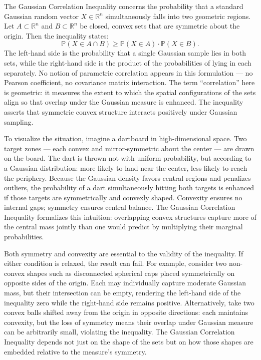 The Gaussian Correlation Inequality concerns the probability that a standard Gaussian random vector \( X \in \mathbb{R}^n \) simultaneously falls into two geometric regions. Let \( A \subset \mathbb{R}^n \) and \( B \subset \mathbb{R}^n \) be closed, convex sets that are symmetric about the origin. Then the inequality states:
\[
\mathbb{P}(X \in A \cap B) \geq \mathbb{P}(X \in A) \cdot \mathbb{P}(X \in B).
\]
The left-hand side is the probability that a single Gaussian sample lies in both sets, while the right-hand side is the product of the probabilities of lying in each separately. No notion of parametric correlation appears in this formulation — no Pearson coefficient, no covariance matrix interaction. The term “correlation” here is geometric: it measures the extent to which the spatial configurations of the sets align so that overlap under the Gaussian measure is enhanced. The inequality asserts that symmetric convex structure interacts positively under Gaussian sampling.

To visualize the situation, imagine a dartboard in high-dimensional space. Two target zones — each convex and mirror-symmetric about the center — are drawn on the board. The dart is thrown not with uniform probability, but according to a Gaussian distribution: more likely to land near the center, less likely to reach the periphery. Because the Gaussian density favors central regions and penalizes outliers, the probability of a dart simultaneously hitting both targets is enhanced if those targets are symmetrically and convexly shaped. Convexity ensures no internal gaps; symmetry ensures central balance. The Gaussian Correlation Inequality formalizes this intuition: overlapping convex structures capture more of the central mass jointly than one would predict by multiplying their marginal probabilities.

Both symmetry and convexity are essential to the validity of the inequality. If either condition is relaxed, the result can fail. For example, consider two non-convex shapes such as disconnected spherical caps placed symmetrically on opposite sides of the origin. Each may individually capture moderate Gaussian mass, but their intersection can be empty, rendering the left-hand side of the inequality zero while the right-hand side remains positive. Alternatively, take two convex balls shifted away from the origin in opposite directions: each maintains convexity, but the loss of symmetry means their overlap under Gaussian measure can be arbitrarily small, violating the inequality. The Gaussian Correlation Inequality depends not just on the shape of the sets but on how those shapes are embedded relative to the measure's symmetry.

